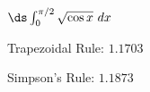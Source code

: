 {$\ds \int_{0}^{\pi/2} \sqrt{\cos x} \ dx$}
{Trapezoidal Rule: 	$1.1703$

Simpson's Rule: $1.1873$
}
